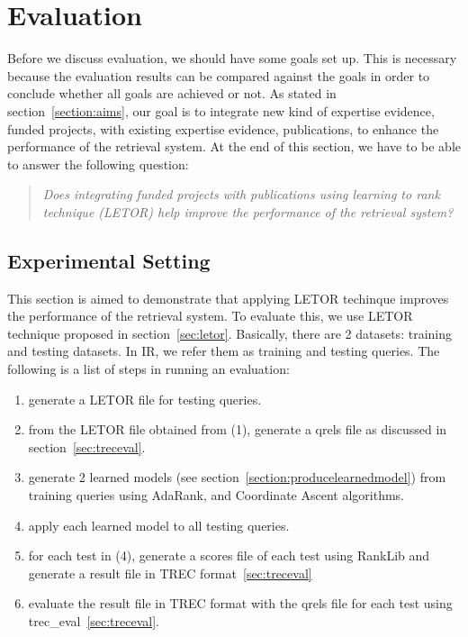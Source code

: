 
\chapter{Evaluation}\label{sec:evaluation}

Before we discuss evaluation, we should have some goals set up. This is necessary because the evaluation results can be compared against the goals in order to
conclude whether all goals are achieved or not. As stated in section~\ref{section:aims}, our goal is to integrate new kind of expertise evidence, funded projects,
with existing expertise evidence, publications, to enhance the performance of the retrieval system. At the end of this section, we have to be able to 
answer the following question:

\begin{quotation}
 \textit{Does integrating funded projects with publications using learning to rank technique (LETOR) help improve the performance of the retrieval system?}
\end{quotation}


\section{Experimental Setting}
This section is aimed to demonstrate that applying LETOR techinque improves the performance of the retrieval system. To evaluate this, we use LETOR
technique proposed in section~\ref{sec:letor}. Basically, there are 2 datasets: training and testing datasets. In IR, 
we refer them as training and testing queries. The following is a list of steps in running an evaluation:
\begin{enumerate}
 \item generate a LETOR file for testing queries.
 \item from the LETOR file obtained from (1), generate a qrels file as discussed in section~\ref{sec:treceval}.
 \item generate 2 learned models (see section~\ref{section:producelearnedmodel}) from training queries using AdaRank, and Coordinate Ascent algorithms.
 \item apply each learned model to all testing queries.
 \item for each test in (4), generate a scores file of each test using RankLib and generate a result file in TREC format~\ref{sec:treceval}
 \item evaluate the result file in TREC format with the qrels file for each test using trec\_eval~\ref{sec:treceval}.
\end{enumerate}

